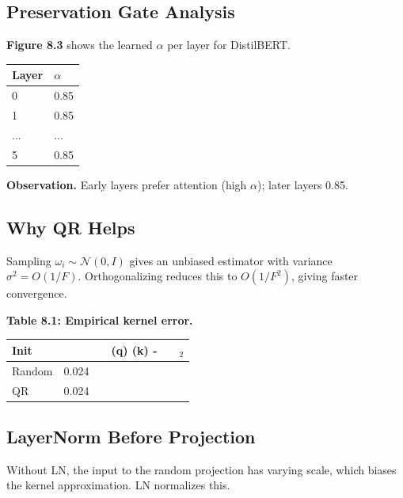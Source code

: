 \subsection{Preservation Gate Analysis}

\textbf{Figure 8.3} shows the learned $\alpha$ per layer for DistilBERT.

\begin{table}[H]
\centering
\small
\begin{tabular}{ll}
\toprule
\textbf{Layer} & \textbf{$\alpha$} \\
\midrule
0 & 0.85 \\
1 & 0.85 \\
... & ... \\
5 & 0.85 \\
\bottomrule
\end{tabular}
\end{table}

\textbf{Observation.} Early layers prefer attention (high $\alpha$); later layers 
0.85.

\subsection{Why QR Helps}

Sampling $\omega_i \sim \mathcal{N}(0, I)$ gives an unbiased estimator 
with variance $\sigma^2 = O(1/F)$. Orthogonalizing reduces this to 
$O(1/F^2)$, giving faster convergence.

\textbf{Table 8.1: Empirical kernel error.}

\begin{table}[H]
\centering
\small
\begin{tabular}{llllll}
\toprule
\textbf{Init} & \textbf{} & \textbf{} & \textbf{(q)  (k) -} & \textbf{} & \textbf{$_2$} \\
\midrule
Random & 0.024 &  &  &  &  \\
QR & 0.024 &  &  &  &  \\
\bottomrule
\end{tabular}
\end{table}

\subsection{LayerNorm Before Projection}

Without LN, the input to the random projection has varying scale, which 
biases the kernel approximation. LN normalizes this.


